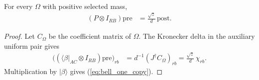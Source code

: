 \begin{theorem}
\label{thm:typical_bell_pin}
\leanok
{}
For every $\Omega$ with positive selected mass,
\begin{align}
 (P\otimes I_{RB})\mathrm{pre}
   &=\frac{\sqrt z}{d}\,\mathrm{post}.
 \label{eq:bell_one_copy}
\end{align}
\end{theorem}
\begin{proof}
\leanok
{}
Let $C_\Omega$ be the coefficient matrix of $\Omega$.
The Kronecker delta in the auxiliary uniform pair gives
\begin{align}
 \bigl((\langle\beta|_{AC}\otimes I_{RB})\mathrm{pre}\bigr)_{rb}
   &=d^{-1}(J^\dagger C_\Omega)_{rb}
    =\frac{\sqrt z}{d}\,\chi_{rb}.
 \label{eq:bell_contracted_coefficient}
\end{align}
Multiplication by $|\beta\rangle$ gives (\ref{eq:bell_one_copy}).
\end{proof}
